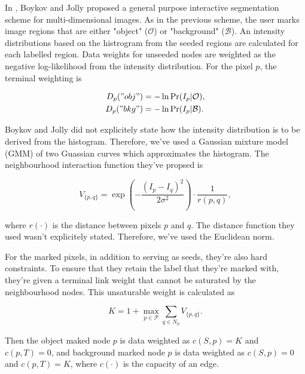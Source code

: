 \begin{definition}
	In \citep{Boykov2001_2}, Boykov and Jolly proposed a general purpose interactive segmentation scheme for multi-dimensional images. As in the previous scheme, the user marks image regions that are either "object" ($\mathcal{O}$) or "background" ($\mathcal{B}$). An intensity distributions based on the histrogram from the seeded regions are calculated for each labelled region. Data weights for unseeded nodes are weighted as the negative log-likelihood from the intensity distribution. For the pixel $p$, the terminal weighting is

\begin{align}
	D_p("obj") &= -\ln\Pr(I_p|\mathcal{O}), \\
	D_p("bkg") &= -\ln\Pr(I_p|\mathcal{B}).
\end{align}

Boykov and Jolly did not explicitely state how the intensity distribution is to be derived from the histogram. Therefore, we've used a Gaussian mixture model (GMM) of two Guassian curves which approximates the histogram. The neighbourhood interaction function they've propsed is

\begin{equation}
	V_{\{p,q\}} = \exp\left( -\frac{(I_p-I_q)^2}{2 \sigma^2}\right)\cdot\frac{1}{r(p,q)},
\end{equation}

where $r(\cdot)$ is the distance between pixels $p$ and $q$. The distance function they used wasn't explicitely stated. Therefore, we've used the Euclidean norm.

For the marked pixels, in addition to serving as seeds, they're also hard constraints. To ensure that they retain the label that they're marked with, they're given a terminal link weight that cannot be saturated by the neighbourhood nodes. This unsaturable weight is calculated as

\begin{equation}
	K = 1 + \max_{p \in \mathcal{P}}\sum_{q \in N_p}V_{\{p,q\}}.
	\label{eq:hardconstraintweight}
\end{equation}

Then the object maked node $p$ is data weighted as $c(S,p)=K$ and $c(p,T)=0$, and background marked node $p$ is data weighted as $c(S,p)=0$ and $c(p,T)=K$, where $c(\cdot)$ is the capacity of an edge.
\end{definition}


